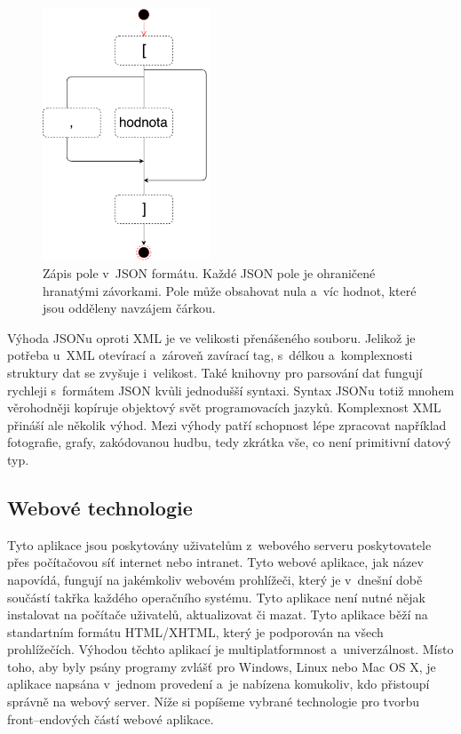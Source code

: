 \begin{itemize}
	\begin{figure}[H]
		\centering
		\includegraphics[width=5cm]{../JSONArray.pdf}
		\caption{Zápis pole v~JSON formátu. Každé JSON pole je ohraničené hranatými závorkami. Pole může obsahovat nula a~víc hodnot, které jsou odděleny navzájem čárkou. }
		\label{fig:JSONArray}
	\end{figure}
\end{itemize}

Výhoda JSONu oproti XML je ve velikosti přenášeného souboru. Jelikož je potřeba u~XML otevírací a~zároveň zavírací tag, s~délkou a~komplexnosti struktury dat se zvyšuje i~velikost. Také knihovny pro parsování dat fungují rychleji s~formátem JSON kvůli jednodušší syntaxi. Syntax JSONu totiž mnohem věrohodněji kopíruje objektový svět programovacích jazyků. 
Komplexnost XML přináší ale několik výhod. Mezi výhody patří schopnost lépe zpracovat například fotografie, grafy, zakódovanou hudbu, tedy zkrátka vše, co není primitivní datový typ.\cite{10}

\subsection{Webové technologie}

Tyto aplikace jsou poskytovány uživatelům z~webového serveru poskytovatele přes počítačovou síť internet nebo intranet. Tyto webové aplikace, jak název napovídá, fungují na jakémkoliv webovém prohlížeči, který je v~dnešní době součástí takřka každého operačního systému. Tyto aplikace není nutné nějak instalovat na počítače uživatelů, aktualizovat či mazat. Tyto aplikace běží na standartním formátu HTML/XHTML, který je podporován na všech prohlížečích. Výhodou těchto aplikací je multiplatformnost a~univerzálnost. Místo toho, aby byly psány programy zvlášť pro Windows, Linux nebo Mac OS X, je aplikace napsána v~jednom provedení a~je nabízena komukoliv, kdo přistoupí správně na webový server. Níže si popíšeme vybrané technologie pro tvorbu front–endových částí webové aplikace.


